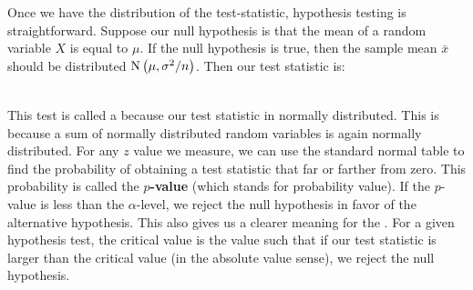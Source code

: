 Once we have the distribution of the test-statistic, hypothesis testing is straightforward.  Suppose our null hypothesis is that the mean of a random variable $X$ is equal to $\mu$.  If the null hypothesis is true, then the sample mean $\bar{x}$ should be distributed ${\rm N}\left(\mu,\sigma^2/n\right)$.  Then our test statistic is:






\ \\



This test is called a  because our test statistic in normally distributed. This is because a sum of normally distributed random variables is again normally distributed. For any $z$ value we measure, we can use the standard normal table to find the probability of obtaining a test statistic that far or farther from zero.  This probability is called the \textbf{$p$-value}  (which stands for probability value). If the $p$-value is less than the $\alpha$-level, we reject the null hypothesis in favor of the alternative hypothesis.  This also gives us a clearer meaning for the .  For a given hypothesis test, the critical value is the value such that if our test statistic is larger than the critical value (in the absolute value sense), we reject the null hypothesis.



